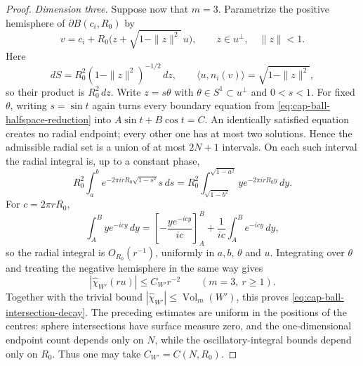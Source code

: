 \documentclass[11pt,reqno,a4paper]{amsart}
\numberwithin{equation}{section}
\theoremstyle{compact}
\theoremstyle{definition}
\theoremstyle{definition}
\newcommand{\Vol}{\operatorname{Vol}}
\begin{document}
\begin{proof}
\smallskip\noindent\emph{Dimension three.}
Suppose now that $m=3$.  Parametrize the positive hemisphere of
$\partial B(c_i,R_0)$ by
\begin{equation}\label{eq:cap-sphere-direction-coordinates}
  v=c_i+R_0\bigl(z+\sqrt{1-\|z\|^2}\,u\bigr),
  \qquad z\in u^\perp,\quad \|z\|<1.
\end{equation}
Here
\begin{equation}\label{eq:cap-sphere-amplitude-cancellation}
  dS=R_0^2(1-\|z\|^2)^{-1/2}\,dz,
  \qquad
  \langle u,n_i(v)\rangle=\sqrt{1-\|z\|^2},
\end{equation}
so their product is $R_0^2\,dz$.  Write $z=s\theta$ with
$\theta\in S^1\subset u^\perp$ and $0<s<1$.  For fixed $\theta$, writing $s=\sin t$ again turns every boundary equation
from \eqref{eq:cap-ball-halfspace-reduction} into
$A\sin t+B\cos t=C$.  An identically satisfied equation creates no radial
endpoint; every other one has at most two solutions.  Hence the admissible
radial set is a union of at most $2N+1$ intervals.  On each such interval the radial
integral is, up to a constant phase,
\begin{equation}\label{eq:cap-sphere-radial-integral}
  R_0^2\int_a^b e^{-2\pi i rR_0\sqrt{1-s^2}}s\,ds
  =R_0^2\int_{\sqrt{1-b^2}}^{\sqrt{1-a^2}}
      y e^{-2\pi i rR_0y}\,dy.
\end{equation}
For $c=2\pi rR_0$,
\[
  \int_A^B y e^{-icy}\,dy
  =\left[-\frac{y e^{-icy}}{ic}\right]_A^B
   +\frac1{ic}\int_A^B e^{-icy}\,dy,
\]
so the radial integral is $O_{R_0}(r^{-1})$, uniformly in $a,b$, $\theta$ and
$u$.  Integrating over $\theta$ and treating the negative hemisphere in the
same way gives
\begin{equation}\label{eq:cap-three-dimensional-face-bound}
  |\widehat\chi_{W'}(ru)|\leq C_{W'}r^{-2}
  \qquad(m=3,\ r\geq1).
\end{equation}
Together with the trivial bound
$|\widehat\chi_{W'}|\leq\Vol_m(W')$, this proves
\eqref{eq:cap-ball-intersection-decay}.  The preceding estimates are uniform
in the positions of the centres: sphere intersections have surface measure
zero, and the one-dimensional endpoint count depends only on $N$, while the
oscillatory-integral bounds depend only on $R_0$.  Thus one may take
$C_{W'}=C(N,R_0)$.


\end{proof}
\end{document}
